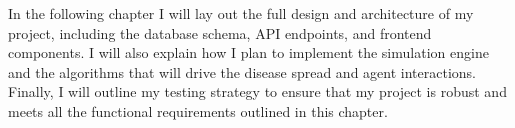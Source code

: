 In the following chapter I will lay out the full design and architecture of my project, including the database schema, API endpoints, and frontend components. I will also explain how I plan to implement the simulation engine and the algorithms that will drive the disease spread and agent interactions. Finally, I will outline my testing strategy to ensure that my project is robust and meets all the functional requirements outlined in this chapter.